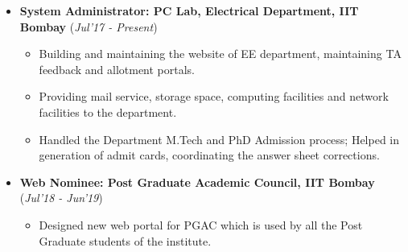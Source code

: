 \documentclass[10pt]{article}
\begin{document}
\begin{itemize}[leftmargin=0.4cm]

\item \textbf {System Administrator: PC Lab, Electrical Department, IIT Bombay} 
\hfill{(\textit{Jul'17 - Present})}
    \begin{itemize}
	\item Building and maintaining the website of EE department, maintaining TA feedback and allotment portals.
	\item Providing mail service, storage space, computing facilities and network facilities to the department.
	\item Handled the Department M.Tech and PhD Admission process; Helped in generation of admit cards, coordinating the answer sheet corrections.
	\end{itemize}
	
	
	
\item \textbf{Web Nominee: Post Graduate Academic Council, IIT Bombay}
\hfill{(\textit{Jul'18 - Jun'19})}
    \begin{itemize}
			\item Designed new web portal for PGAC which is used by all the Post Graduate students of the institute. 	
	\end{itemize}
	
\begin{comment}
\item \textbf{Mess Secretary: Hostel-1, IIT Bombay}
\hfill{(\textit{Sep'17 - Mar'18})}
    \begin{itemize}
            \item Managed all mess related activities for a mess which catered for 250+ students with an approximate budget of 8,00,000/- per month.
		\end{itemize}
			
\end{comment}

    	
\end{itemize}


\colorbox{bl}{}
\end{document}
